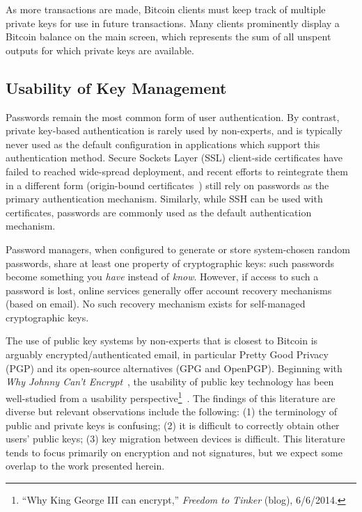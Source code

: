 As more transactions are made, Bitcoin clients must keep track of multiple private keys for use in future transactions. Many clients prominently display a Bitcoin balance on the main screen, which represents the sum of all unspent outputs for which private keys are available. 

\subsection{Usability of Key Management}

Passwords remain the most common form of user authentication. By contrast, private key-based authentication is rarely used by non-experts, and is typically never used as the default configuration in applications which support this authentication method. Secure Sockets Layer (SSL) client-side certificates have failed to reached wide-spread deployment, and recent efforts to reintegrate them in a different form (\eg origin-bound certificates~\cite{DCBW12}) still rely on passwords as the primary authentication mechanism. Similarly, while SSH can be used with certificates, passwords are commonly used as the default authentication mechanism.

Password managers, when configured to generate or store system-chosen random passwords, share at least one property of cryptographic keys: such passwords become something you \emph{have} instead of \emph{know}. However, if access to such a password is lost, online services generally offer account recovery mechanisms (\eg based on email). No such recovery mechanism exists for self-managed cryptographic keys.

The use of public key systems by non-experts that is closest to Bitcoin is arguably encrypted/authenticated email, in particular Pretty Good Privacy (PGP) and its open-source alternatives (\ie GPG and OpenPGP). Beginning with \emph{Why Johnny Can't Encrypt}~\cite{WT99}, the usability of public key technology has been well-studied from a usability perspective\footnote{``Why King George III can encrypt,'' \textit{Freedom to Tinker} (blog), 6/6/2014.}~\cite{GM05,GMSN+05,SBKH06,GFF06}. The findings of this literature are diverse but relevant observations include the following: (1) the terminology of public and private keys is confusing; (2) it is difficult to correctly obtain other users' public keys; (3) key migration between devices is difficult. This literature tends to focus primarily on encryption and not signatures, but we expect some overlap to the work presented herein. 

